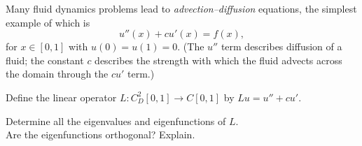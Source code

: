 
Many fluid dynamics problems lead to 
\emph{advection--diffusion} equations, the 
simplest example of which is
\[ u''(x) + c u'(x) = f(x),\]
for $x\in[0,1]$ with $u(0)=u(1) = 0$.
(The $u''$ term describes diffusion of a fluid;
the constant $c$ describes the strength with which
the fluid advects across the domain through the $cu'$ term.)

\vspace*{1em}
Define the linear operator $L: C^2_D[0,1] \to C[0,1]$ by $L u = u'' + c u'$.

\vspace*{1em}
Determine all the eigenvalues and eigenfunctions of $L$.\\
Are the eigenfunctions orthogonal?  Explain.


